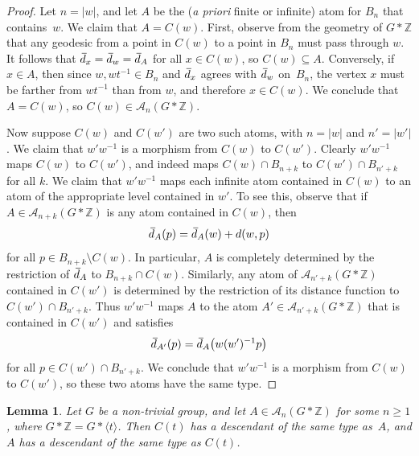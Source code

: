 \documentclass[11pt,letterpaper]{amsart}
\newtheorem{lemma}[theorem]{Lemma}
\theoremstyle{definition}
\newcommand{\Z}{\mathbb{Z}}
\newcommand{\A}{\mathcal{A}}
\newcommand{\od}{\mkern 3mu\overline{\mkern-3mu d\mkern 1.5mu}\mkern-1.5mu}
\begin{document}
\begin{proof}
Let $n=|w|$, and let $A$ be the (\textit{a priori} finite or infinite) atom for $B_n$ that contains~$w$.  We claim that $A=C(w)$.  First, observe from the geometry of $G*\Z$ that any geodesic from a point in $C(w)$ to a point in $B_n$ must pass through $w$.  It follows that $\od_x=\od_w=\od_A$ for all $x\in C(w)$, so $C(w)\subseteq A$.  Conversely, if $x\in A$, then since $w,wt^{-1}\in B_n$ and $\od_x$ agrees with $\od_w$ on~$B_n$, the vertex $x$ must be farther from $wt^{-1}$ than from $w$, and therefore $x\in C(w)$.  We conclude that $A=C(w)$, so $C(w)\in \A_n(G*\Z)$.

Now suppose $C(w)$ and $C(w')$ are two such atoms, with $n=|w|$ and $n'=|w'|$. We claim that $w'w^{-1}$ is a morphism from $C(w)$ to $C(w')$.  Clearly $w'w^{-1}$ maps $C(w)$ to $C(w')$, and indeed maps $C(w)\cap B_{n+k}$ to $C(w')\cap B_{n'+k}$ for all $k$.  We claim that $w'w^{-1}$ maps each infinite atom contained in $C(w)$ to an atom of the appropriate level contained in $w'$.  To see this, observe that if $A\in \A_{n+k}(G*\Z)$ is any atom contained in $C(w)$, then
\[
\od_A(p) = \od_A(w) + d(w,p)
\]
for all $p\in B_{n+k}\setminus C(w)$.  In particular, $A$ is completely determined by the restriction of $\od_A$ to $B_{n+k}\cap C(w)$.  Similarly, any atom of $\A_{n'+k}(G*\Z)$ contained in $C(w')$ is determined by the restriction of its distance function to $C(w')\cap B_{n'+k}$.  Thus $w'w^{-1}$ maps $A$ to the atom $A'\in \A_{n'+k}(G*\Z)$ that is contained in $C(w')$ and satisfies
\[
\od_{A'}(p) = \od_A\bigl(w(w')^{-1}p\bigr)
\]
for all $p\in C(w')\cap B_{n'+k}$. We conclude that $w'w^{-1}$ is a morphism from $C(w)$ to $C(w')$, so these two atoms have the same type.
\end{proof}

\begin{lemma}\label{lem:atoms_in_atoms}
Let $G$ be a non-trivial group, and let $A\in \A_{n}(G*\Z)$ for some $n\geq 1$, where $G*\Z=G*\langle t\rangle$.  Then $C(t)$ has a descendant of the same type as~$A$, and $A$ has a descendant of the same type as $C(t)$.
\end{lemma}
\end{document}
